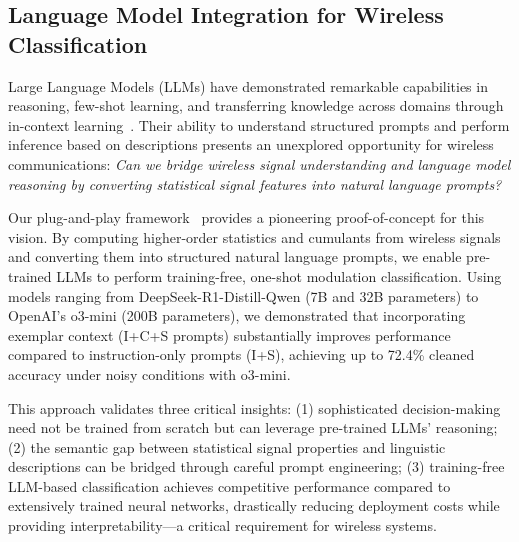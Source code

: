 \subsection{Language Model Integration for Wireless Classification}

Large Language Models (LLMs) have demonstrated remarkable capabilities in reasoning, few-shot learning, and transferring knowledge across domains through in-context learning~\cite{}. Their ability to understand structured prompts and perform inference based on descriptions presents an unexplored opportunity for wireless communications: \textit{Can we bridge wireless signal understanding and language model reasoning by converting statistical signal features into natural language prompts?}

Our plug-and-play framework~\cite{rostami2025plug} provides a pioneering proof-of-concept for this vision. By computing higher-order statistics and cumulants from wireless signals and converting them into structured natural language prompts, we enable pre-trained LLMs to perform training-free, one-shot modulation classification. Using models ranging from DeepSeek-R1-Distill-Qwen (7B and 32B parameters) to OpenAI's o3-mini (200B parameters), we demonstrated that incorporating exemplar context (I+C+S prompts) substantially improves performance compared to instruction-only prompts (I+S), achieving up to 72.4\% cleaned accuracy under noisy conditions with o3-mini.

This approach validates three critical insights: (1) sophisticated decision-making need not be trained from scratch but can leverage pre-trained LLMs' reasoning; (2) the semantic gap between statistical signal properties and linguistic descriptions can be bridged through careful prompt engineering; (3) training-free LLM-based classification achieves competitive performance compared to extensively trained neural networks, drastically reducing deployment costs while providing interpretability—a critical requirement for wireless systems.
